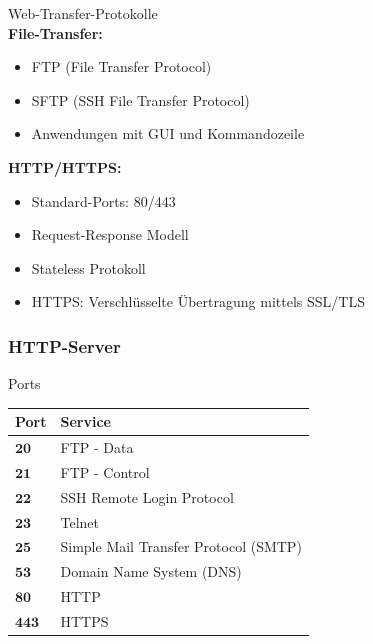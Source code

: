 \begin{definition}{Web-Transfer-Protokolle}\\
    \textbf{File-Transfer:}
    \begin{itemize}
        \item FTP (File Transfer Protocol)
        \item SFTP (SSH File Transfer Protocol)
        \item Anwendungen mit GUI und Kommandozeile
    \end{itemize}

    \textbf{HTTP/HTTPS:}
    \begin{itemize}
        \item Standard-Ports: 80/443
        \item Request-Response Modell
        \item Stateless Protokoll
        \item HTTPS: Verschlüsselte Übertragung mittels SSL/TLS
    \end{itemize}
\end{definition}

\subsubsection{HTTP-Server}

\begin{corollary}{Ports}
    \begin{center}
    \begin{tabular}{|l|l|}
    \hline
    Port & Service \\
    \hline
    $\mathbf{20}$ & FTP - Data \\
    \hline
    $\mathbf{21}$ & FTP - Control \\
    \hline
    $\mathbf{22}$ & SSH Remote Login Protocol \\
    \hline
    $\mathbf{23}$ & Telnet \\
    \hline
    $\mathbf{25}$ & Simple Mail Transfer Protocol (SMTP) \\
    \hline
    $\mathbf{53}$ & Domain Name System (DNS) \\
    \hline
    $\mathbf{80}$ & HTTP \\
    \hline
    $\mathbf{443}$ & HTTPS \\
    \hline
    \end{tabular}
    \end{center}
\end{corollary}

